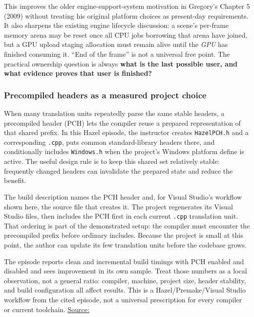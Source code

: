 This improves the older engine-support-system motivation in Gregory's Chapter 5 (2009) without treating his original platform choices as present-day requirements. It also sharpens the existing engine lifecycle discussion: a scene's per-frame memory arena may be reset once all CPU jobs borrowing that arena have joined, but a GPU upload staging allocation must remain alive until the \emph{GPU} has finished consuming it. ``End of the frame'' is not a universal free point. The practical ownership question is always \textbf{what is the last possible user, and what evidence proves that user is finished?}

\subsubsection{Precompiled headers as a measured project choice}\label{precompiled-headers-as-a-measured-project-choice}

When many translation units repeatedly parse the same stable headers, a precompiled header (PCH) lets the compiler reuse a prepared representation of that shared prefix. In this Hazel episode, the instructor creates \texttt{HazelPCH.h} and a corresponding \texttt{.cpp}, puts common standard-library headers there, and conditionally includes \texttt{Windows.h} when the project's Windows platform define is active. The useful design rule is to keep this shared set relatively stable: frequently changed headers can invalidate the prepared state and reduce the benefit.

The build description names the PCH header and, for Visual Studio's workflow shown here, the source file that creates it. The project regenerates its Visual Studio files, then includes the PCH first in each current \texttt{.cpp} translation unit. That ordering is part of the demonstrated setup: the compiler must encounter the precompiled prefix before ordinary includes. Because the project is small at this point, the author can update its few translation units before the codebase grows.

The episode reports clean and incremental build timings with PCH enabled and disabled and sees improvement in its own sample. Treat those numbers as a local observation, not a general ratio: compiler, machine, project size, header stability, and build configuration all affect results. This is a Hazel/Premake/Visual Studio workflow from the cited episode, not a universal prescription for every compiler or current toolchain. \href{https://www.youtube.com/watch?v=UQ718BrbQ5E}{Source:}

